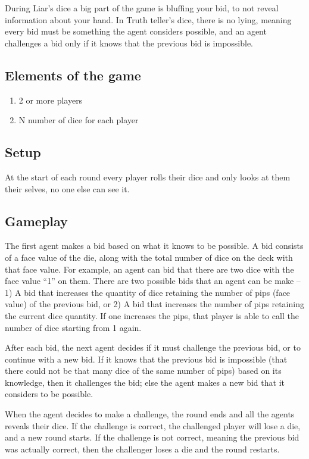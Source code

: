 \documentclass{article}
\begin{document}
During Liar's dice a big part of the game is bluffing your bid, to not reveal information about your hand. In Truth teller's dice, there is no lying, meaning every bid must be something the agent considers possible, and an agent challenges a bid only if it knows that the previous bid is impossible.

\subsection*{Elements of the game} %
\begin{enumerate}
    \item 2 or more players
    \item N number of dice for each player
\end{enumerate}
\subsection*{Setup} %
At the start of each round every player rolls their dice and only looks at them their selves, no one else can see it.

\subsection*{Gameplay} %
The first agent makes a bid based on what it knows to be possible. A bid consists of a face value of the die, along with the total number of dice on the deck with that face value. For example, an agent can bid that there are two dice with the face value “1” on them. There are two possible bids that an agent can be make – 1) A bid that increases the quantity of dice retaining the number of pips (face value) of the previous bid, or 2) A bid that increases the number of pips retaining the current dice quantity. If one increases the pips, that player is able to call the number of dice starting from 1 again.

After each bid, the next agent decides if it must challenge the previous bid, or to continue with a new bid. If it knows that the previous bid is impossible (that there could not be that many dice of the same number of pips) based on its knowledge, then it challenges the bid; else the agent makes a new bid that it considers to be possible. 

When the agent decides to make a challenge, the round ends and all the agents reveals their dice. If the challenge is correct, the challenged player will lose a die, and a new round starts. If the challenge is not correct, meaning the previous bid was actually correct, then the challenger loses a die and the round restarts.
\end{document}
